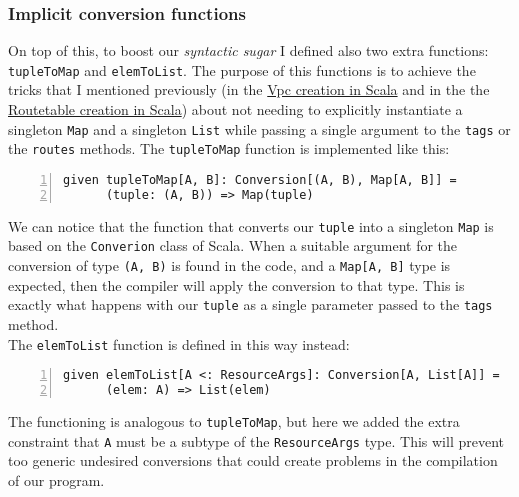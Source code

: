 \subsubsection{Implicit conversion functions}
\label{sssec:implicit-converion-functions}
On top of this, to boost our \textit{syntactic sugar} I defined also two extra functions: \texttt{tupleToMap} and \texttt{elemToList}.
The purpose of this functions is to achieve the tricks that I mentioned previously (in the \hyperref[sssec:vpc-creation-scala]{Vpc creation in Scala} and in the the \hyperref[sssec:routetable-creation-scala]{Routetable creation in Scala}) about not needing to explicitly instantiate a singleton \texttt{Map} and a singleton \texttt{List} while passing a single argument to the \texttt{tags} or the \texttt{routes} methods.
The \texttt{tupleToMap} function is implemented like this:\\
\begin{minipage}{\linewidth}
\begin{lstlisting}[numbers=left, numberstyle=\tiny, numbersep=-5pt, stepnumber=1, linewidth=420pt]
  given tupleToMap[A, B]: Conversion[(A, B), Map[A, B]] =
	  (tuple: (A, B)) => Map(tuple)
\end{lstlisting}
\end{minipage}
We can notice that the function that converts our \texttt{tuple} into a singleton \texttt{Map} is based on the \texttt{Converion} class of Scala.
When a suitable argument for the conversion of type \texttt{(A, B)} is found in the code, and a \texttt{Map[A, B]} type is expected, then the compiler will apply the conversion to that type.
This is exactly what happens with our \texttt{tuple} as a single parameter passed to the \texttt{tags} method.\\
The \texttt{elemToList} function is defined in this way instead:\\
\begin{minipage}{\linewidth}
\begin{lstlisting}[numbers=left, numberstyle=\tiny, numbersep=-5pt, stepnumber=1, linewidth=420pt]
  given elemToList[A <: ResourceArgs]: Conversion[A, List[A]] =
	  (elem: A) => List(elem)
\end{lstlisting}
\end{minipage}
The functioning is analogous to \texttt{tupleToMap}, but here we added the extra constraint that \texttt{A} must be a subtype of the \texttt{ResourceArgs} type.
This will prevent too generic undesired conversions that could create problems in the compilation of our program.


